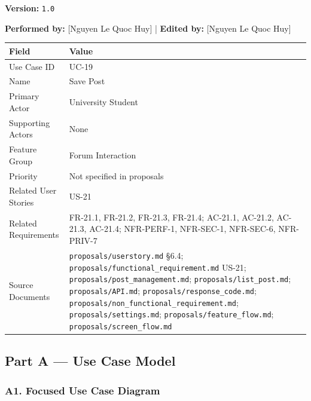 \documentclass[12pt]{article}
\renewcommand{\baselinestretch}{1.5}
\begin{document}
\textbf{Version:} \texttt{1.0}
\par\medskip

\textbf{Performed by:} [Nguyen Le Quoc Huy] | \textbf{Edited by:} [Nguyen Le Quoc Huy]
\par\medskip

\begingroup
\small
\renewcommand{\baselinestretch}{1.0}\selectfont
\renewcommand{\arraystretch}{1.15}
\setlength{\tabcolsep}{6pt}
\begin{longtable}{|>{\raggedright\arraybackslash}p{}|>{\raggedright\arraybackslash}p{}|}
\hline
\textbf{Field} & \textbf{Value} \\ \hline
\endhead
Use Case ID & UC-19 \\ \hline
Name & Save Post \\ \hline
Primary Actor & University Student \\ \hline
Supporting Actors & None \\ \hline
Feature Group & Forum Interaction \\ \hline
Priority & Not specified in proposals \\ \hline
Related User Stories & US-21 \\ \hline
Related Requirements & FR-21.1, FR-21.2, FR-21.3, FR-21.4; AC-21.1, AC-21.2, AC-21.3, AC-21.4; NFR-PERF-1, NFR-SEC-1, NFR-SEC-6, NFR-PRIV-7 \\ \hline
Source Documents & \texttt{proposals/userstory.md} §6.4; \texttt{proposals/functional\_requirement.md} US-21; \texttt{proposals/post\_management.md}; \texttt{proposals/list\_post.md}; \texttt{proposals/API.md}; \texttt{proposals/response\_code.md}; \texttt{proposals/non\_functional\_requirement.md}; \texttt{proposals/settings.md}; \texttt{proposals/feature\_flow.md}; \texttt{proposals/screen\_flow.md} \\ \hline
\end{longtable}
\endgroup
\par\medskip

\hypertarget{sec:part-a-use-case-model}{}
\subsection*{Part A --- Use Case Model}
\par\medskip

\hypertarget{sec:a1-focused-use-case-diagram}{}
\subsubsection*{A1. Focused Use Case Diagram}
\par\medskip
\end{document}
